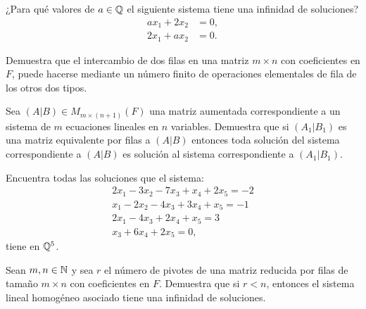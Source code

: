 \documentclass[12pt,a4paper]{book}
\begin{document}
    \begin{ejercicio}
        ¿Para qué valores de $a \in \mathbb{Q}$ el siguiente sistema tiene una infinidad de soluciones?
        \begin{align}
            ax_{1} + 2x_{2} & = 0, \tag{6.1} \label{6.1}\\
            2x_{1} + ax_{2} & = 0. \tag{6.2} \label{6.2}
        \end{align}
    \end{ejercicio}

    \begin{ejercicio}
        Demuestra que el intercambio de dos filas en una matriz $m \times n$ con coeficientes en $F$, puede hacerse mediante un número finito de operaciones elementales de fila de los otros dos tipos.
    \end{ejercicio}

    \begin{ejercicio}
        Sea $(A|B) \in M_{m \times (n+1)}(F)$ una matriz aumentada correspondiente a un sistema de $m$ ecuaciones lineales en $n$ variables. Demuestra que si $(A_{1}|B_{1})$ es una matriz equivalente por filas a $(A|B)$ entonces toda solución del sistema correspondiente a $(A|B)$ es solución al sistema correspondiente a $(A_{1}|B_{1})$.
    \end{ejercicio}

    \begin{ejercicio}
        Encuentra todas las soluciones que el sistema:
        \begin{align*}
            2x_{1} - 3x_{2} - 7x_{3} + x_{4} + 2x_{5} = - 2\\
            x_{1} - 2x_{2} - 4x_{3} + 3x_{4} + x_{5} = - 1\\
            2x_{1} - 4x_{3} + 2x_{4} + x_{5} = 3\\
            x_{3} + 6x_{4} + 2x_{5} = 0,
        \end{align*}
        tiene en $\mathbb{Q}^{5}$.
    \end{ejercicio}

    \begin{ejercicio}
        Sean $m,n \in \mathbb{N}$ y sea $r$ el número de pivotes de una matriz reducida por filas de tamaño $m \times n$ con coeficientes en $F$. Demuestra que si $r < n$, entonces el sistema lineal homogéneo asociado tiene una infinidad de soluciones.
    \end{ejercicio}
\end{document}
